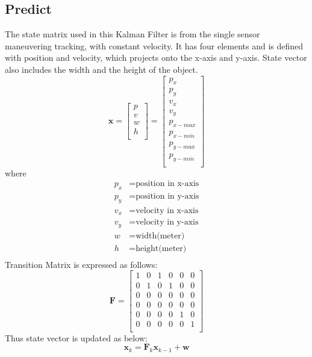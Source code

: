 \subsection{Predict}\label{sec:2-predict}
The state matrix used in this Kalman Filter \cite{kalman} is from the single sensor maneuvering tracking, with constant velocity.
It has four elements and is defined with position and velocity, which projects onto the x-axis and y-axis.
State vector also includes the width and the height of the object\cite{4732695}.
\begin{equation}\label{equ:state_eq}
    \mathbf{x} = 
        \begin{bmatrix} 
        p \\ 
        v \\
        w \\
        h \\

        \end{bmatrix} = 
        \begin{bmatrix} 
        p_x \\ 
        p_y \\ 
        v_x \\ 
        v_y \\
        p_{x-max} \\
        p_{x-min} \\
        p_{y-max} \\
        p_{y-min} \\
        \end{bmatrix}
\end{equation}
where
\begin{align*}
    p_x &=\text{position in x-axis}\\
    p_y &=\text{position in y-axis}\\
    v_x &=\text{velocity in x-axis}\\
    v_y &=\text{velocity in y-axis}\\
    w &=\text{width(meter)}\\%
    h &=\text{height(meter)}\\
\end{align*}
Transition Matrix is expressed as follows:
\begin{equation}\label{equ:transition_matrix_H}
    \mathbf{F} = 
    \begin{bmatrix}
        1 & 0 & 1 & 0 & 0 & 0\\
        0 & 1 & 0 & 1 & 0 & 0\\
        0 & 0 & 0 & 0 & 0 & 0\\
        0 & 0 & 0 & 0 & 0 & 0\\
        0 & 0 & 0 & 0 & 1 & 0\\
        0 & 0 & 0 & 0 & 0 & 1\\
      \end{bmatrix}
\end{equation}
Thus state vector is updated as below:
\begin{equation}\label{equ:predict_eq}
    \mathbf{x}_k=\mathbf{F}_k\mathbf{x}_{k-1}+\mathbf{w}
\end{equation}

